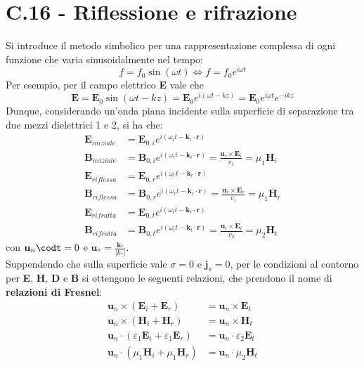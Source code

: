 \documentclass{article}
\begin{document}
\section*{C.16 - Riflessione e rifrazione}
Si introduce il metodo simbolico per una rappresentazione complessa di ogni funzione che varia sinusoidalmente nel tempo:
\begin{equation}
    f=f_0\sin(\omega t) \Leftrightarrow f=f_0e^{i\omega t}
    \nonumber
\end{equation}
Per esempio, per il campo elettrico \textbf{E} vale che 
\begin{equation}
    \textbf{E}=\textbf{E}_0\sin(\omega t-kz)= \textbf{E}_0e^{i(\omega t-kz)}=\textbf{E}_0e^{i\omega t}e^{-ikz}
    \nonumber
\end{equation}
Dunque, considerando un'onda piana incidente sulla superficie di separazione tra due mezzi dielettrici 1 e 2, si ha che:
\begin{equation}
\begin{split}
    \textbf{E}_{iniziale}&=\textbf{E}_{0,i}e^{i(\omega_i t-\textbf{k}_i\cdot\textbf{r})} \\
    \textbf{B}_{iniziale}&=\textbf{B}_{0,i}e^{i(\omega_i t-\textbf{k}_i\cdot\textbf{r})}=\frac{\textbf{u}_i\times\textbf{E}_i}{v_1}=\mu_1\textbf{H}_i \\
    \textbf{E}_{riflessa}&=\textbf{E}_{0,r}e^{i(\omega_r t-\textbf{k}_r\cdot\textbf{r})} \\
    \textbf{B}_{riflessa}&=\textbf{B}_{0,r}e^{i(\omega_r t-\textbf{k}_r\cdot\textbf{r})}=\frac{\textbf{u}_r\times\textbf{E}_r}{v_1}=\mu_1\textbf{H}_r \\
    \textbf{E}_{rifratta}&=\textbf{E}_{0,t}e^{i(\omega_t t-\textbf{k}_t\cdot\textbf{r})} \\
    \textbf{B}_{rifratta}&=\textbf{B}_{0,t}e^{i(\omega_t t-\textbf{k}_t\cdot\textbf{r})}=\frac{\textbf{u}_t\times\textbf{E}_t}{v_2}=\mu_2\textbf{H}_t
    \nonumber
\end{split}
\end{equation}
con $\textbf{u}_n\codt=0$ e $\textbf{u}_*= \frac{\textbf{k}_*}{|k_*|}$. \\
Suppendendo che sulla superficie vale $\sigma =0$ e $\textbf{j}_s=0$, per le condizioni al contorno per \textbf{E}, \textbf{H}, \textbf{D} e \textbf{B} si ottengono le seguenti relazioni, che prendono il nome di \textbf{relazioni di Fresnel}:
\begin{equation}
\begin{split}
    \textbf{u}_n\times(\textbf{E}_i+\textbf{E}_r)&= \textbf{u}_n\times\textbf{E}_t \\
    \textbf{u}_n\times(\textbf{H}_i+\textbf{H}_r)&= \textbf{u}_n\times\textbf{H}_t \\
    \textbf{u}_n\cdot(\varepsilon_1\textbf{E}_i + \varepsilon_1\textbf{E}_r) &= \textbf{u}_n\cdot \varepsilon_2 \textbf{E}_t \\
    \textbf{u}_n\cdot(\mu_1\textbf{H}_i+\mu_1\textbf{H}_r)&= \textbf{u}_n\cdot \mu_2\textbf{H}_t
    \nonumber
\end{split}
\end{equation}
\end{document}

